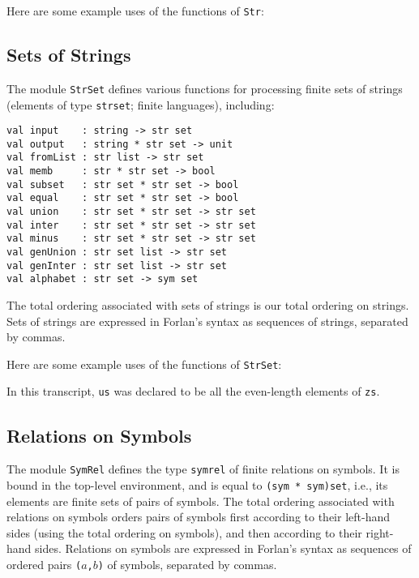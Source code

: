 Here are some example uses of the functions of \texttt{Str}:


\subsection{Sets of Strings}

The module \texttt{StrSet}
%
defines various functions for processing
finite sets of strings (elements of type \texttt{str\;set};
%
finite languages),
%
including:
\begin{verbatim}
val input    : string -> str set
val output   : string * str set -> unit
val fromList : str list -> str set
val memb     : str * str set -> bool
val subset   : str set * str set -> bool
val equal    : str set * str set -> bool
val union    : str set * str set -> str set
val inter    : str set * str set -> str set
val minus    : str set * str set -> str set
val genUnion : str set list -> str set
val genInter : str set list -> str set
val alphabet : str set -> sym set
\end{verbatim}
%
%
%
%
%
%
%
%
%
%
%
%
The total ordering associated with sets of strings is our
total ordering on strings.
Sets of strings are expressed in Forlan's syntax as sequences of strings,
separated by commas.

Here are some example uses of the functions of \texttt{StrSet}:

In this transcript, \texttt{us} was declared to be all the even-length
elements of \texttt{zs}.

\subsection{Relations on Symbols}

The module \texttt{SymRel}
%
defines the type \texttt{sym\underscoresym rel}
%
%
of finite relations on symbols.
%
It is bound in the top-level environment, and is
equal to \texttt{(sym * sym)set}, i.e., its elements are finite sets
of pairs of symbols.  The total ordering associated with relations
on symbols orders pairs of symbols first according to their
left-hand sides (using the total ordering on symbols), and then
according to their right-hand sides.
Relations on symbols are expressed in Forlan's syntax as sequences of ordered
pairs \texttt{($a$,$b$)} of symbols, separated by commas.
%
%

